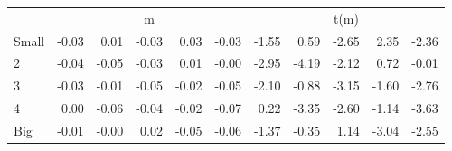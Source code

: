 \begin{table}[!ht]
\begin{tabular}{lrrrrrrrrrr}
  
     & \multicolumn{5}{c}{m} & \multicolumn{5}{c}{t(m)}   \\
     \cmidrule(r){2-6} \cmidrule(r){7-11} 
    Small  & -0.03  & 0.01  & -0.03  & 0.03  & -0.03  & -1.55  & 0.59  & -2.65  & 2.35  & -2.36   \\
    2  & -0.04  & -0.05  & -0.03  & 0.01  & -0.00  & -2.95  & -4.19  & -2.12  & 0.72  & -0.01   \\
    3  & -0.03  & -0.01  & -0.05  & -0.02  & -0.05  & -2.10  & -0.88  & -3.15  & -1.60  & -2.76   \\
    4  & 0.00  & -0.06  & -0.04  & -0.02  & -0.07  & 0.22  & -3.35  & -2.60  & -1.14  & -3.63   \\
    Big  & -0.01  & -0.00  & 0.02  & -0.05  & -0.06  & -1.37  & -0.35  & 1.14  & -3.04  & -2.55   \\
    
  
  \bottomrule
\end{tabular}
\label{tbl:25_Size_BM_F17}
\end{table}